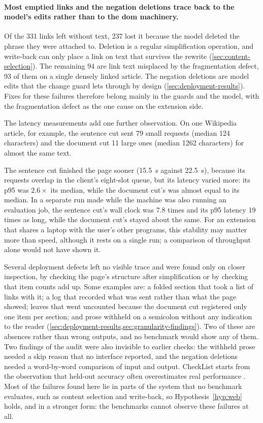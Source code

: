 \paragraph{Most emptied links and the negation deletions trace back to the model's edits rather than to the \gls{dom} machinery.}
Of the \num{331} links left without text, \num{237} lost it because the model deleted the phrase they were attached to.
Deletion is a regular simplification operation, and write-back can only place a link on text that survives the rewrite (\cref{sec:content-selection}).
The remaining 94 are link text misplaced by the fragmentation defect, 93 of them on a single densely linked article.
The negation deletions are model edits that the change guard lets through by design (\cref{sec:deployment-results}).
Fixes for these failures therefore belong mainly in the guards and the model, with the fragmentation defect as the one cause on the extension side.

The latency measurements add one further observation.
On one Wikipedia article, for example, the sentence cut sent 79 small requests (median \num{124} characters) and the document cut 11 large ones (median \num{1262} characters) for almost the same text.

\pagebreak

The sentence cut finished the page sooner (\qty{15.5}{\second} against \qty{22.5}{\second}), because its requests overlap in the client's eight-slot queue, but its latency varied more: its \gls{p95} was \(2.6\times\) its median, while the document cut's was almost equal to its median.
In a separate run made while the machine was also running an evaluation job, the sentence cut's wall clock was \num{7.8} times and its \gls{p95} latency 19 times as long, while the document cut's stayed about the same.
For an extension that shares a laptop with the user's other programs, this stability may matter more than speed, although it rests on a single run; a comparison of throughput alone would not have shown it.

Several deployment defects left no visible trace and were found only on closer inspection, by checking the page's structure after simplification or by checking that item counts add up.
Some examples are: a folded section that took a list of links with it; a log that recorded what was sent rather than what the page showed; leaves that went uncounted because the document cut registered only one item per section; and prose withheld on a semicolon without any indication to the reader (\cref{sec:deployment-results,sec:granularity-findings}).
Two of these are absences rather than wrong outputs, and no benchmark would show any of them.
Two findings of the audit were also invisible to earlier checks: the withheld prose needed a skip reason that no interface reported, and the negation deletions needed a word-by-word comparison of input and output.
CheckList starts from the observation that held-out accuracy often overestimates real performance \parencite[4902]{ribeiro-etal-2020-beyond}.
Most of the failures found here lie in parts of the system that no benchmark evaluates, such as content selection and write-back, so Hypothesis~\cref{hyp:web} holds, and in a stronger form: the benchmarks cannot observe these failures at all.

